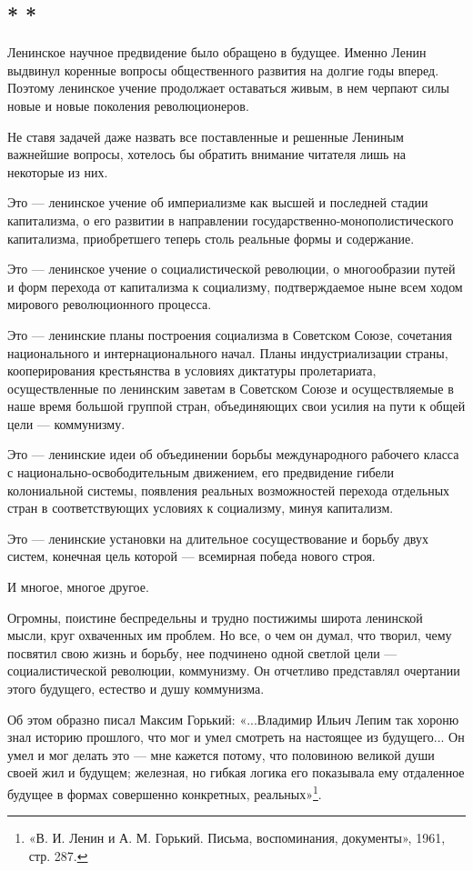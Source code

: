 \documentclass[12pt, a4paper, openany]{book}
\begin{document}
\subsection*{\center * * *}

Ленинское научное предвидение было обращено в будущее. Именно Ленин выдвинул коренные вопросы общественного развития на долгие годы вперед. Поэтому ленинское учение продолжает оставаться живым, в нем черпают силы новые и новые поколения революционеров.

Не ставя задачей даже назвать все поставленные и решенные Лениным важнейшие вопросы, хотелось бы обратить внимание читателя лишь на некоторые из них.

Это — ленинское учение об империализме как высшей и последней стадии капитализма, о его развитии в направлении государственно-монополистического капитализма, приобретшего теперь столь реальные формы и содержание.

Это — ленинское учение о социалистической революции, о многообразии путей и форм перехода от капитализма к социализму, подтверждаемое ныне всем ходом мирового революционного процесса.

Это — ленинские планы построения социализма в Советском Союзе, сочетания национального и интернационального начал. Планы индустриализации страны, кооперирования крестьянства в условиях диктатуры пролетариата, осуществленные по ленинским заветам в Советском Союзе и осуществляемые в наше время большой группой стран, объединяющих свои усилия на пути к общей цели — коммунизму.

Это — ленинские идеи об объединении борьбы международного рабочего класса с национально-освободительным движением, его предвидение гибели колониальной системы, появления реальных возможностей перехода отдельных стран в соответствующих условиях к социализму, минуя капитализм.

Это — ленинские установки на длительное сосуществование и борьбу двух систем, конечная цель которой — всемирная победа нового строя.

И многое, многое другое.

Огромны, поистине беспредельны и трудно постижимы широта ленинской мысли, круг охваченных им проблем. Но все, о чем он думал, что творил, чему посвятил свою жизнь и борьбу, нее подчинено одной светлой цели — социалистической революции, коммунизму. Он отчетливо представлял очертании этого будущего, естество и душу коммунизма.

Об этом образно писал Максим Горький: «...Владимир Ильич Лепим так хороню знал историю прошлого, что мог и умел смотреть на настоящее из будущего... Он умел и мог делать это — мне кажется потому, что половиною великой души своей жил и будущем; железная, но гибкая логика его показывала ему отдаленное будущее в формах совершенно конкретных, реальных»\footnote{«В. И. Ленин и А. М. Горький. Письма, воспоминания, документы», 1961, стр. 287.}.
\end{document}
